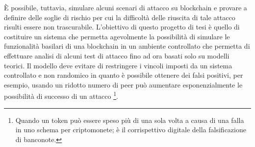 È possibile, tuttavia, simulare alcuni scenari di attacco su blockchain e provare a definire delle soglie di rischio per cui la difficoltà delle riuscita di tale attacco risulti essere non trascurabile.\newline
L'obiettivo di questo progetto di tesi è quello di costituire un sistema che permetta agevolmente la possibilità di simulare le funzionalità basilari di una blockchain in un ambiente controllato che permetta di effettuare analisi di alcuni test di attacco fino ad ora basati solo su modelli teorici. Il modello deve evitare di restringere i vincoli imposti da un sistema controllato e non randomico in quanto è possibile ottenere dei falsi positivi, per esempio, usando un ridotto numero di peer può aumentare esponenzialmente le possibilità di successo di un attacco \footnote{Quando un token può essere speso più di una sola volta a causa di una falla in uno schema per criptomonete; è il corrispettivo digitale della falsificazione di banconote.}.


